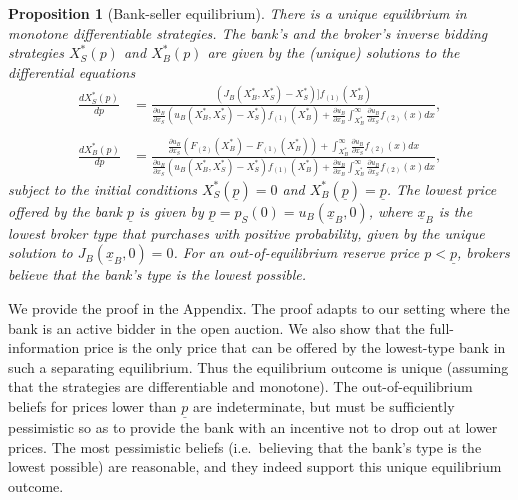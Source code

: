 \documentclass[11pt,twopage]{article}
\newcommand{\ul}{\underline}
\newtheorem{proposition}{Proposition}
{\bf}{\it}
\begin{document}
\begin{proposition}[Bank-seller equilibrium]\label{prop:nonjudicial}
  There is a unique equilibrium in monotone differentiable
  strategies. The bank's and the broker's inverse bidding strategies
  $X_S^*(p)$ and $X_B^*(p)$ are given by the (unique) solutions to the
  differential equations
  \begin{align}
    \frac{d X_S^*(p)}{dp}&=
    \frac{(J_B(X_B^*,X_S^*)-X_S^*)]f_{(1)}(X_B^*)}{ \frac{\partial
        u_B}{\partial x_S} (u_B(X_B^*,X_S^*)-X_S^*)f_{(1)}(X_B^*)+
      \frac{ \partial u_B}{\partial x_B } \int_{X_B^*}^\infty
      \frac{ \partial u_B} {\partial x_S} f_{(2)}(x) dx
    },\label{eq:sdifeq} \\ \nonumber
    \\
    \frac{d X_B^*(p)}{dp}&= \frac{ \frac{ \partial u_B} {\partial
        x_S}( F_{(2)}(X_B^*) - F_{(1)}(X_B^*)) + \int_{X_B^*}^\infty
      \frac{ \partial u_B} {\partial x_S} f_{(2)}(x) dx }{
      \frac{\partial u_B}{\partial x_S}
      (u_B(X_B^*,X_S^*)-X_S^*)f_{(1)}(X_B^*)+ \frac{ \partial
        u_B}{\partial x_B } \int_{X_B^*}^\infty \frac{ \partial u_B}
      {\partial x_S} f_{(2)}(x) dx \label{eq:bdifeq} } ,
  \end{align}
  subject to the initial conditions $X_S^*(\ul p) = 0$ and $X_B^*(\ul
  p) = \ul p$.  The lowest price offered by the bank $\ul p$ is given
  by $ \ul p = p_S(0) = u_B(\ul x_B, 0)$, where $\ul x_B$ is the
  lowest broker type that purchases with positive probability, given
  by the unique solution to $J_B(\ul x_B,0) = 0$.  For an
  out-of-equilibrium reserve price $p<\ul p$, brokers believe that the
  bank's type is the lowest possible.
\end{proposition}
We provide the proof in the Appendix. The proof adapts
\cite{cai2007reserve} to our setting where the bank is an active
bidder in the open auction. We also show that the full-information
price is the only price that can be offered by the lowest-type bank in
such a separating equilibrium. Thus the equilibrium outcome is unique
(assuming that the strategies are differentiable and monotone). The
out-of-equilibrium beliefs for prices lower than $\underline p$ are
indeterminate, but must be sufficiently pessimistic so as to provide
the bank with an incentive not to drop out at lower prices. The most
pessimistic beliefs (i.e.\, believing that the bank's type is the
lowest possible) are reasonable, and they indeed support this unique
equilibrium outcome.
\end{document}
